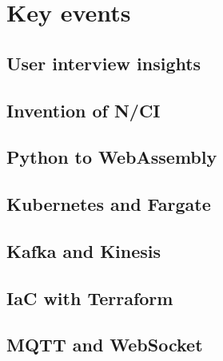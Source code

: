\section{Key events}
\label{chapter4-key-events}

\subsection{User interview insights}
\label{chapter4-user-interview-insights}

\subsection{Invention of N/CI}
\label{chapter4-invention-of-nci}

\subsection{Python to WebAssembly}
\label{chapter4-python-to-webassembly}

\subsection{Kubernetes and Fargate}
\label{chapter4-kubernetes-and-aws-fargate}

\subsection{Kafka and Kinesis}
\label{chapter4-kafka-aws-kinesis}

\subsection{IaC with Terraform}
\label{chapter4-iac-with-terraform}

\subsection{MQTT and WebSocket}
\label{chapter4-mqtt-and-websocket}

